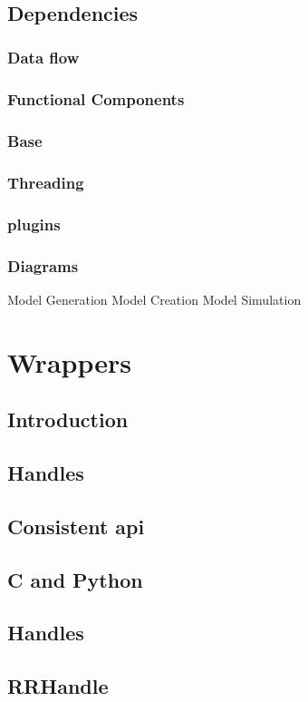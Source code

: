 \documentclass[12pt, letter, oneside]{book}
\begin{document}
\\
\subsection{Dependencies}
\subsubsection{Data flow}
\subsubsection{Functional Components}
\subsubsection{Base}
\subsubsection{Threading}
\subsubsection{plugins}
\subsubsection{Diagrams}
Model Generation
Model Creation
Model Simulation
\section{Wrappers}
\subsection{Introduction}
\subsection{Handles}
\subsection{Consistent api}
\subsection{C and Python}
\subsection{Handles}
\subsection{RRHandle}
\end{document}
